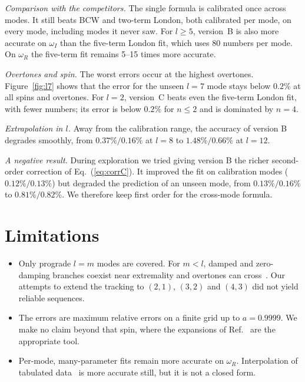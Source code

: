 \documentclass[prd,twocolumn,superscriptaddress,nofootinbib]{revtex4-2}
\begin{document}
\textit{Comparison with the competitors.} The single formula is calibrated once across modes. It still beats BCW and
two-term London, both calibrated per mode, on every mode, including modes it never saw. For $l\ge5$, version~B is
also more accurate on $\omega_I$ than the five-term London fit, which uses 80 numbers per mode. On $\omega_R$ the
five-term fit remains 5--15 times more accurate.

\textit{Overtones and spin.} The worst errors occur at the highest overtones. Figure~\ref{fig:l7} shows that the error
for the unseen $l=7$ mode stays below $0.2\%$ at all spins and overtones. For $l=2$, version~C beats even the
five-term London fit, with fewer numbers; its error is below $0.2\%$ for $n\le2$ and is dominated by $n=4$.

\textit{Extrapolation in $l$.} Away from the calibration range, the accuracy of version B degrades smoothly, from
$0.37\%/0.16\%$ at $l=8$ to $1.48\%/0.66\%$ at $l=12$.

\textit{A negative result.} During exploration we tried giving version B the richer second-order correction of
Eq.~(\ref{eq:corrC}). It improved the fit on calibration modes ($0.12\%/0.13\%$) but degraded the prediction of an
unseen mode, from $0.13\%/0.16\%$ to $0.81\%/0.82\%$. We therefore keep first order for the cross-mode formula.

\section{Limitations}\label{sec:limits}

\begin{itemize}
\item Only prograde $l=m$ modes are covered. For $m<l$, damped and zero-damping branches coexist near extremality
and overtones can cross~\cite{Yang:2012pj,Cook:2014cta}. Our attempts to extend the tracking to $(2,1)$, $(3,2)$ and
$(4,3)$ did not yield reliable sequences.
\item The errors are maximum relative errors on a finite grid up to $a=0.9999$. We make no claim beyond that spin,
where the expansions of Ref.~\cite{Cook:2014cta} are the appropriate tool.
\item Per-mode, many-parameter fits remain more accurate on $\omega_R$. Interpolation of tabulated
data~\cite{Stein:2019mop} is more accurate still, but it is not a closed form.
\end{itemize}
\end{document}
